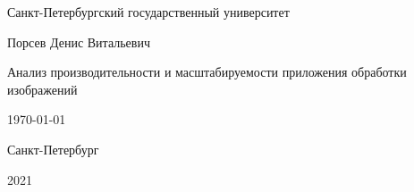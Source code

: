 \begin{titlepage}
\begin{center}
Санкт-Петербургский
государственный университет \\[3mm]

\vspace{65mm}

\begin{large} 
Порсев Денис Витальевич \\[3mm]
\end{large}

\vspace{3mm}

\begin{Large}
Анализ производительности и масштабируемости приложения обработки изображений
\end{Large} 

\vspace{3mm}

\begin{large}
\today
\end{large}

\vfill 

{Санкт-Петербург}
\par{2021}
\end{center}
\end{titlepage}
\restoregeometry
\addtocounter{page}{1}